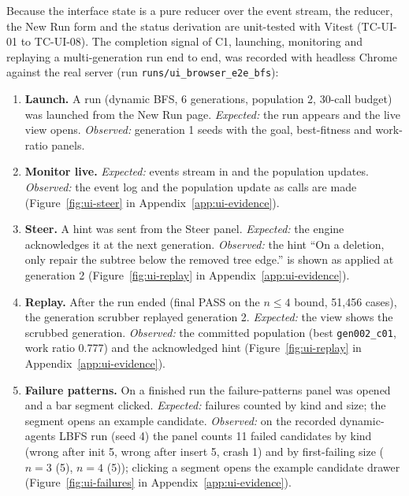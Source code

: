 Because the interface state is a pure reducer over the event stream, the
reducer, the New Run form and the status derivation are unit-tested with Vitest
(TC-UI-01 to TC-UI-08). The completion signal of C1, launching, monitoring and
replaying a multi-generation run end to end, was recorded with headless Chrome
against the real server (run \texttt{runs/ui\_browser\_e2e\_bfs}):

\begin{enumerate}
  \item \textbf{Launch.} A run (dynamic BFS, 6 generations, population 2,
    30-call budget) was launched from the New Run page. \emph{Expected:} the
    run appears and the live view opens. \emph{Observed:} generation 1 seeds
    with the goal, best-fitness and work-ratio panels.
  \item \textbf{Monitor live.} \emph{Expected:} events stream in and the
    population updates. \emph{Observed:} the event log and the population
    update as calls are made (Figure~\ref{fig:ui-steer} in Appendix~\ref{app:ui-evidence}).
  \item \textbf{Steer.} A hint was sent from the Steer panel.
    \emph{Expected:} the engine acknowledges it at the next generation.
    \emph{Observed:} the hint ``On a deletion, only repair the subtree below
    the removed tree edge.'' is shown as applied at generation 2
    (Figure~\ref{fig:ui-replay} in Appendix~\ref{app:ui-evidence}).
  \item \textbf{Replay.} After the run ended (final PASS on the $n \le 4$
    bound, 51{,}456 cases), the generation scrubber replayed generation 2.
    \emph{Expected:} the view shows the scrubbed generation. \emph{Observed:}
    the committed population (best \texttt{gen002\_c01}, work ratio 0.777) and
    the acknowledged hint (Figure~\ref{fig:ui-replay} in Appendix~\ref{app:ui-evidence}).
  \item \textbf{Failure patterns.} On a finished run the failure-patterns panel
    was opened and a bar segment clicked. \emph{Expected:} failures counted by
    kind and size; the segment opens an example candidate. \emph{Observed:} on
    the recorded dynamic-agents LBFS run (seed 4) the panel counts 11 failed
    candidates by kind (wrong after init 5, wrong after insert 5, crash 1) and
    by first-failing size ($n = 3$ (5), $n = 4$ (5)); clicking a segment opens
    the example candidate drawer (Figure~\ref{fig:ui-failures} in Appendix~\ref{app:ui-evidence}).
\end{enumerate}

